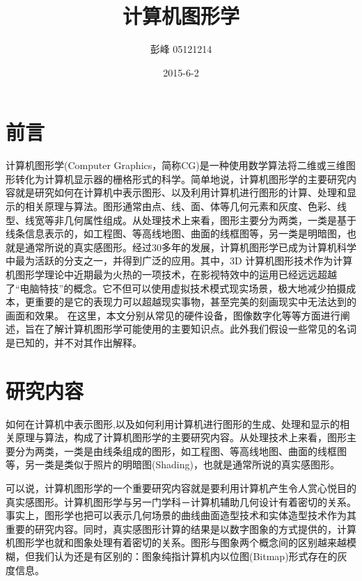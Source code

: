\documentclass[UTF8]{article}
\begin{document}
 
\author{    彭峰     05121214   }
 \date{2015-6-2}
\title{计算机图形学}  %
\titlelabel{\S\thetitle\quad}
\maketitle%


\section{前言}
计算机图形学(Computer Graphics，简称CG)是一种使用数学算法将二维或三维图形转化为计算机显示器的栅格形式的科学。简单地说，计算机图形学的主要研究内容就是研究如何在计算机中表示图形、以及利用计算机进行图形的计算、处理和显示的相关原理与算法。图形通常由点、线、面、体等几何元素和灰度、色彩、线型、线宽等非几何属性组成。从处理技术上来看，图形主要分为两类，一类是基于线条信息表示的，如工程图、等高线地图、曲面的线框图等，另一类是明暗图，也就是通常所说的真实感图形。经过30多年的发展，计算机图形学已成为计算机科学中最为活跃的分支之一，并得到广泛的应用。其中，3D 计算机图形技术作为计算机图形学理论中近期最为火热的一项技术，在影视特效中的运用已经远远超越了“电脑特技”的概念。它不但可以使用虚拟技术模式现实场景，极大地减少拍摄成本，更重要的是它的表现力可以超越现实事物，甚至完美的刻画现实中无法达到的画面和效果。
在这里，本文分别从常见的硬件设备，图像数字化等等方面进行阐述，旨在了解计算机图形学可能使用的主要知识点。此外我们假设一些常见的名词是已知的，并不对其作出解释。

\section{研究内容}
如何在计算机中表示图形,以及如何利用计算机进行图形的生成、处理和显示的相关原理与算法，构成了计算机图形学的主要研究内容。从处理技术上来看，图形主要分为两类，一类是由线条组成的图形，如工程图、等高线地图、曲面的线框图等，另一类是类似于照片的明暗图(Shading)，也就是通常所说的真实感图形。

可以说，计算机图形学的一个重要研究内容就是要利用计算机产生令人赏心悦目的真实感图形。计算机图形学与另一门学科－计算机辅助几何设计有着密切的关系。事实上，图形学也把可以表示几何场景的曲线曲面造型技术和实体造型技术作为其重要的研究内容。同时，真实感图形计算的结果是以数字图象的方式提供的，计算机图形学也就和图象处理有着密切的关系。图形与图象两个概念间的区别越来越模糊，但我们认为还是有区别的：图象纯指计算机内以位图(Bitmap)形式存在的灰度信息。
\end{document}
